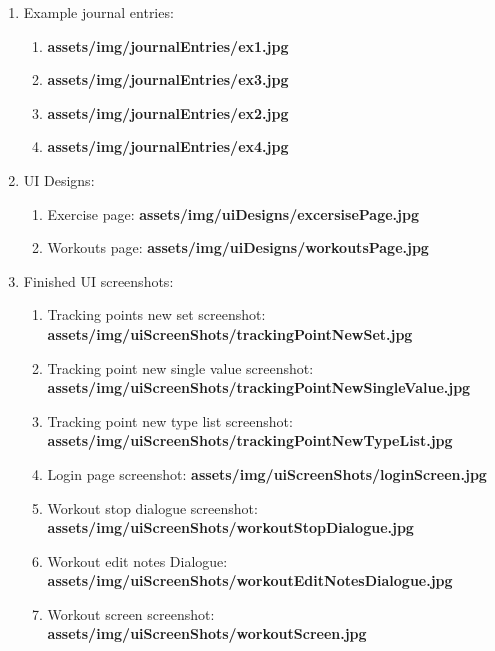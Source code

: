 \documentclass{article}
\begin{document}
\begin{multicols}{2}
\begin{enumerate}
  \item Example journal entries:
    \begin{enumerate}
      \item \textbf{assets/img/journalEntries/ex1.jpg}\\
      \item \textbf{assets/img/journalEntries/ex3.jpg}\\
      \item \textbf{assets/img/journalEntries/ex2.jpg}\\ 
      \item \textbf{assets/img/journalEntries/ex4.jpg}\\ 
    \end{enumerate}
  \item UI Designs:
    \begin{enumerate}
      \item Exercise page: \textbf{assets/img/uiDesigns/excersisePage.jpg}\\
      \item Workouts page: \textbf{assets/img/uiDesigns/workoutsPage.jpg}\\ 
    \end{enumerate}
  \item Finished UI screenshots:
    \begin{enumerate} 
      \item Tracking points new set screenshot: \textbf{assets/img/uiScreenShots/trackingPointNewSet.jpg}\\
      \item Tracking point new single value screenshot: \textbf{assets/img/uiScreenShots/trackingPointNewSingleValue.jpg}\\
      \item Tracking point new type list screenshot: \textbf{assets/img/uiScreenShots/trackingPointNewTypeList.jpg}\\
      \item Login page screenshot: \textbf{assets/img/uiScreenShots/loginScreen.jpg}\\ 
      \item Workout stop dialogue screenshot: \textbf{assets/img/uiScreenShots/workoutStopDialogue.jpg}\\
      \item Workout edit notes Dialogue: \textbf{assets/img/uiScreenShots/workoutEditNotesDialogue.jpg}\\ 
      \item Workout screen screenshot: \textbf{assets/img/uiScreenShots/workoutScreen.jpg}\\

\end{enumerate}
\end{enumerate}
\end{multicols}
\end{document}
